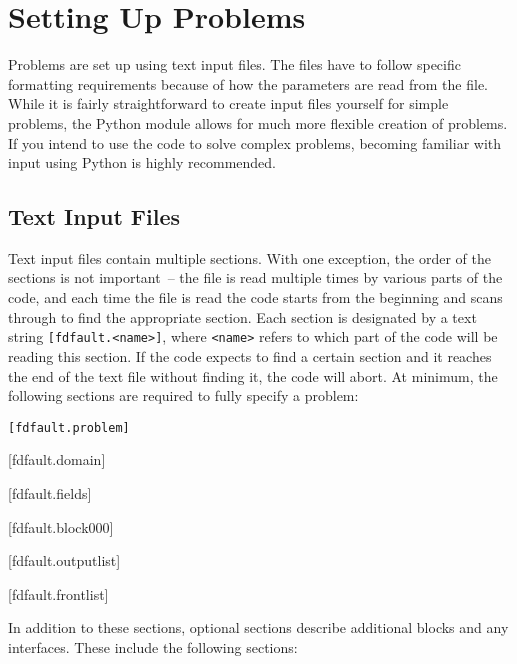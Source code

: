 \documentclass[12pt]{article}   	%
\begin{document}
\section{Setting Up Problems}

Problems are set up using text input files. The files have to follow specific formatting requirements because of how the parameters are read from the file. While it is fairly straightforward to create input files yourself for simple problems, the Python module allows for much more flexible creation of problems. If you intend to use the code to solve complex problems, becoming familiar with input using Python is highly recommended.

\subsection{Text Input Files}

Text input files contain multiple sections. With one exception, the order of the sections is not important~-- the file is read multiple times by various parts of the code, and each time the file is read the code starts from the beginning and scans through to find the appropriate section. Each section is designated by a text string {\tt [fdfault.<name>]}, where {\tt <name>} refers to which part of the code will be reading this section. If the code expects to find a certain section and it reaches the end of the text file without finding it, the code will abort. At minimum, the following sections are required to fully specify a problem:

\vspace{0.1in}
{\tt [fdfault.problem]

[fdfault.domain]

[fdfault.fields]

[fdfault.block000]

[fdfault.outputlist]

[fdfault.frontlist]}

\vspace{0.1in}
\noindent In addition to these sections, optional sections describe additional blocks and any interfaces. These include the following sections:

\vspace{0.1in}
\end{document}
